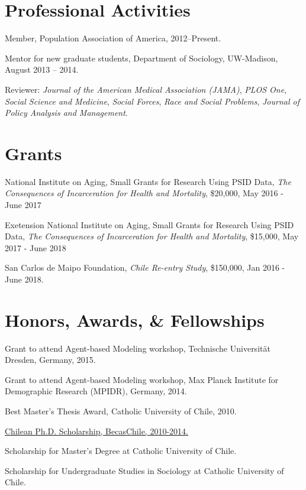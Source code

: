 \documentclass[10pt,letterpaper]{article}
\renewenvironment{itemize}{
  \begin{list}{}{
    \setlength{\leftmargin}{1.5em}
    \setlength{\itemsep}{0.25em}
    \setlength{\parskip}{0pt}
    \setlength{\parsep}{0.25em}
  }
}{
  \end{list}
}
\begin{document}
\section*{Professional Activities}

\begin{itemize}
\item Member, Population Association of America, 2012--Present.
\item Mentor for new graduate students, Department of Sociology, UW-Madison,
August 2013 – 2014.
\item Reviewer: \textit{Journal of the American Medical Association (JAMA)}, \textit{PLOS One}, \textit{Social Science and Medicine}, \textit{Social Forces}, \textit{Race and Social Problems}, \textit{Journal of Policy Analysis and Management}.
\end{itemize}

\section*{Grants}

\begin{itemize}
\item National Institute on Aging, Small Grants for Research Using PSID Data, \textit{The Consequences of Incarceration for Health and Mortality},  \$20,000, May 2016 - June 2017
\item Exetension National Institute on Aging, Small Grants for Research Using PSID Data, \textit{The Consequences of Incarceration for Health and Mortality},  \$15,000, May 2017 - June 2018
\item San Carlos de Maipo Foundation, \textit{Chile Re-entry Study}, \$150,000, Jan 2016 - June 2018.
\end{itemize}


\section*{Honors, Awards, \& Fellowships}

\begin{itemize}
\item Grant to attend Agent-based Modeling workshop, Technische Universität Dresden, Germany, 2015.
\item Grant to attend Agent-based Modeling workshop, Max Planck Institute for Demographic Research (MPIDR), Germany, 2014.
\item Best Master's Thesis Award, Catholic University of Chile, 2010.
\item \href{http://www.becaschile.cl}{Chilean Ph.D. Scholarship, BecasChile, 2010-2014.}
\item Scholarship for Master’s Degree at Catholic University of Chile.
\item Scholarship for Undergraduate Studies in Sociology at Catholic University of Chile.
\end{itemize}
\end{document}
